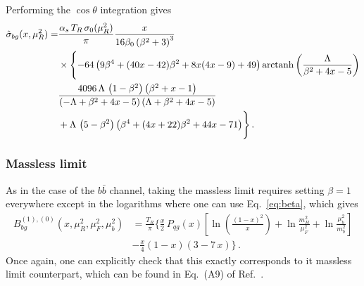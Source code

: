 Performing the $\cos\theta$ integration gives
\begin{equation}
  \begin{split}
    \hat{\sigma}_{bg}(x,\mu_R^2) =&
    \frac{\alpha_s\,T_R\,\sigma_0(\mu_R^2)}{\pi}\frac{  x}{16 \beta_0
      \left(\beta^2+3\right)^3}\\
    &\times\Biggl\{- 64 \left(9 \beta^4+(40
     x-42) \beta^2 +8 x (4 x-9)+49\right){\rm arctanh}\left(\frac{\Lambda }{\beta^2+4
       x-5}\right)   \\
    &\frac{4096\,\Lambda\, \left(1-\beta^2 \right)
      \left(\beta^2+x-1\right)} {\left(-\Lambda +\beta^2+4 x-5\right)
      \left(\Lambda +\beta^2+4 x-5\right)} \\  
    &+\Lambda\,\left(5-\beta^2\right) \left(\beta^4+(4 x+22) \beta^2+44 x-71\right)
  \Biggr\}\,.
  \end{split}
\end{equation}

\subsubsection{Massless limit}
As in the case of the $b\bar{b}$ channel, taking the massless limit
requires setting $\beta=1$ everywhere except in the logarithms where
one can use Eq.~\eqref{eq:beta}, which gives
\begin{align}
  \label{eq:mlimbg}
  B_{bg}^{(1),(0)}(x,\mu_R^2,\mu_F^2,\mu_b^2) &=
  \frac{T_R}{\pi}\biggl\{  
    \frac{x}{2}\,P_{qg}(x)\left[
      \ln\left(\frac{(1-x)^2}{x}\right)+\ln\frac{m_H^2}{\mu_F^2}+
      \ln{\frac{\mu_b^2}{m_b^2}} \right]\nonumber \\ &-\frac{x}{4}(1-x)(3-7\,x) \biggr\}\,.
\end{align}
Once again, one can explicitly check that this exactly corresponds to
it massless limit counterpart, which can be found in Eq.~(A9) of Ref.~\cite{Harlander:2003ai}.
